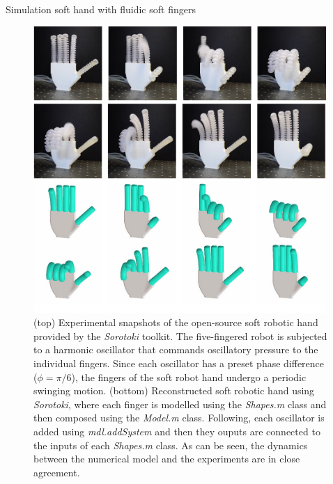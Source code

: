 \begin{example}{Simulation soft hand with fluidic soft fingers}
\begin{figure}[!t]
\centering
\includegraphics*[width=0.99\textwidth]{./pdf/thesis-figurex-6-14-1.pdf}
\caption{(top) Experimental snapshots of the open-source soft robotic hand provided by the \textit{Sorotoki} toolkit. The five-fingered robot is subjected to a harmonic oscillator that commands oscillatory pressure to the individual fingers. Since each oscillator has a preset phase difference ($\phi = \pi/6$), the fingers of the soft robot hand undergo a periodic swinging motion. (bottom) Reconstructed soft robotic hand using \textit{Sorotoki}, where each finger is modelled using the \textit{Shapes.m} class and then composed using the \textit{Model.m} class. Following, each oscillator is added using \textit{mdl.addSystem} and then they ouputs are connected to the inputs of each \textit{Shapes.m} class. As can be seen, the dynamics between the numerical model and the experiments are in close agreement. }
\label{fig:C5:soft_hand_simulation}
\end{figure}
\end{example}
\clearpage
